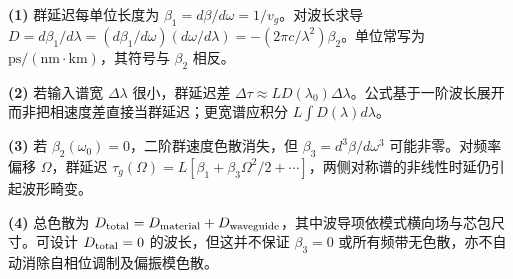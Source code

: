 \par\noindent\textbf{(1)} 群延迟每单位长度为 \(\beta_1=d\beta/d\omega=1/v_g\)。对波长求导 \(D=d\beta_1/d\lambda=(d\beta_1/d\omega)(d\omega/d\lambda)=-(2\pi c/\lambda^2)\beta_2\)。单位常写为 \(\mathrm{ps/(nm\cdot km)}\)，其符号与 \(\beta_2\) 相反。
\par\noindent\textbf{(2)} 若输入谱宽 \(\Delta\lambda\) 很小，群延迟差 \(\Delta\tau\approx L D(\lambda_0)\Delta\lambda\)。公式基于一阶波长展开而非把相速度差直接当群延迟；更宽谱应积分 \(L\int D(\lambda)d\lambda\)。
\par\noindent\textbf{(3)} 若 \(\beta_2(\omega_0)=0\)，二阶群速度色散消失，但 \(\beta_3=d^3\beta/d\omega^3\) 可能非零。对频率偏移 \(\Omega\)，群延迟 \(\tau_g(\Omega)=L[\beta_1+\beta_3\Omega^2/2+\cdots]\)，两侧对称谱的非线性时延仍引起波形畸变。
\par\noindent\textbf{(4)} 总色散为 \(D_{\rm total}=D_{\rm material}+D_{\rm waveguide}\)，其中波导项依模式横向场与芯包尺寸。可设计 \(D_{\rm total}=0\) 的波长，但这并不保证 \(\beta_3=0\) 或所有频带无色散，亦不自动消除自相位调制及偏振模色散。
